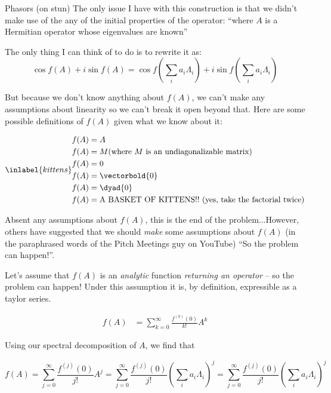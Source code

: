 \begin{answer}
\begin{answerpart}{Phasors (on stun)}
  The only issue I have with this construction is that we didn't make
  use of the any of the initial properties of the operator: ``where
  $A$ is a Hermitian operator whose eigenvalues are known''

  The only thing I can think of to do is to rewrite it as:
  \begin{equation}
    \cos{f(A)} + i\sin{f(A)} = \cos{f(\sum_i a_i\Lambda_i)} + i\sin{f(\sum_i a_i\Lambda_i)}
  \end{equation}

  But because we don't know anything about $f(A)$, we can't make any
  assumptions about linearity so we can't break it open beyond that.
  Here are some possible definitions of $f(A)$ given what we know
  about it:

  \begin{equation}
    \inlabel{kittens}
    \begin{split}
      f(A) &= A\\
      f(A) &= M \text{(where\ }M\text{\ is\ an\ undiagonalizable\ matrix)}\\
      f(A) &= 0\\
      f(A) &= \vectorbold{0}\\
      f(A) &= \dyad{0}\\
      f(A) &= \text{A BASKET OF KITTENS}!!\text{ (yes, take the factorial twice)}\\
    \end{split}
  \end{equation}

  Absent any assumptions about $f(A)$, this is the end of the
  problem...However, others have suggested that we should \emph{make}
  some assumptions about $f(A)$ (in the paraphrased words of the Pitch
  Meetings guy on YouTube) ``So the problem can happen!''.

  Let's assume that $f(A)$ is an \emph{analytic} function
  \emph{returning an operator} -- so the problem can happen!  Under
  this assumption it is, by definition, expressible as a taylor
  series.

  \begin{equation}
    \begin{split}
      f(A) &= \sum_{k=0}^{\infty} \frac{f^{(k)}(0)}{k!} A^k
    \end{split}
  \end{equation}

  Using our spectral decomposition of $A$, we find that

  \begin{equation}
    f(A)
    = \sum_{j=0}^{\infty} \frac{f^{(j)}(0)}{j!} A^j
    = \sum_{j=0}^{\infty} \frac{f^{(j)}(0)}{j!} \left(\sum_i a_i\Lambda_i\right)^j
    = \sum_{j=0}^{\infty} \frac{f^{(j)}(0)}{j!} \left(\sum_i a_i\Lambda_i\right)^j
  \end{equation}


\end{answerpart}
\end{answer}
